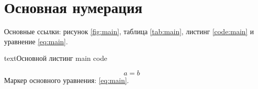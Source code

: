 \documentclass[a4paper,12pt]{report}
\begin{document}
\chapter{Основная нумерация}
Основные ссылки: рисунок \ref{fig:main}, таблица \ref{tab:main}, листинг \ref{code:main} и уравнение \eqref{eq:main}.
\begin{code}{text}{Основной листинг}
main code
\end{code}
\begin{equation}
  \label{eq:main}
  a = b
\end{equation}
Маркер основного уравнения: \eqref{eq:main}.
\end{document}
